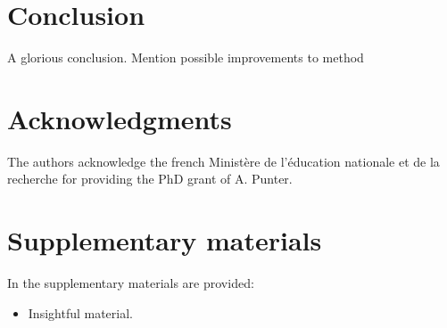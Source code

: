 \documentclass[aip,reprint,nofootinbib]{revtex4-1}
\begin{document}
%
%


\section{Conclusion}
\label{sec:conc}

A glorious conclusion. Mention possible improvements to method

\section{Acknowledgments}
The authors acknowledge the french Ministère de l'éducation
nationale et de la recherche for providing the PhD grant of A. Punter.

\section{Supplementary materials}
In the supplementary materials are provided:
\begin{itemize}
\item Insightful material.
\end{itemize}


 
\end{document}
